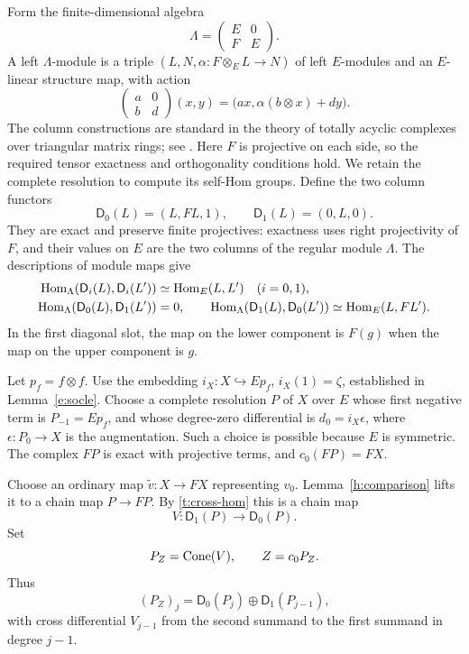 Form the finite-dimensional algebra
\begin{equation}\label{t:triangular-algebra}
 \Lambda=\begin{pmatrix}E&0\\F&E\end{pmatrix}.
\end{equation}
A left $\Lambda$-module is a triple
$(L,N,\alpha:F\otimes_E L\to N)$ of left $E$-modules and an
$E$-linear structure map, with action
\[
 \begin{pmatrix}a&0\\b&d\end{pmatrix}(x,y)
 =\bigl(ax,\alpha(b\otimes x)+dy\bigr).
\]
The column constructions are standard in the theory of totally acyclic
complexes over triangular matrix rings; see
\cite[Lemma~2.2 and Proposition~2.3]{EshraghiEtAl2014v1}.
Here $F$ is projective on each side, so the required tensor exactness
and orthogonality conditions hold. We retain the complete resolution
to compute its self-Hom groups. Define the two column functors
\[
 \mathsf D_0(L)=(L,FL,1),
 \qquad \mathsf D_1(L)=(0,L,0).
\]
They are exact and preserve finite projectives: exactness uses right
projectivity of $F$, and their values on $E$ are the two columns of
the regular module $\Lambda$.  The descriptions of module maps give
\begin{align}
 \operatorname{Hom}_\Lambda(\mathsf D_i(L),\mathsf D_i(L'))
   &\simeq\operatorname{Hom}_E(L,L')\quad(i=0,1),\label{t:diagonal-hom}\\
 \operatorname{Hom}_\Lambda(\mathsf D_0(L),\mathsf D_1(L'))&=0,
 \qquad
 \operatorname{Hom}_\Lambda(\mathsf D_1(L),\mathsf D_0(L'))
   \simeq\operatorname{Hom}_E(L,FL').\label{t:cross-hom}
\end{align}
In the first diagonal slot, the map on the lower component is $F(g)$
when the map on the upper component is $g$.

Let $p_f=f\otimes f$.  Use the embedding
$i_X:X\hookrightarrow Ep_f$, $i_X(1)=\zeta$, established in
Lemma~\ref{e:socle}.  Choose a complete resolution
$P$ of $X$ over $E$ whose first negative term is
$P_{-1}=Ep_f$, and whose degree-zero differential is
$d_0=i_X\epsilon$, where $\epsilon:P_0\to X$ is the augmentation.
Such a choice is possible because $E$ is symmetric.  The complex
$FP$ is exact with projective terms, and $c_0(FP)=FX$.

Choose an ordinary map $\widetilde v:X\to FX$ representing $v_0$.
Lemma~\ref{h:comparison} lifts it to a chain map $P\to FP$.
By \eqref{t:cross-hom} this is a chain map
\[
 V:\mathsf D_1(P)\longrightarrow\mathsf D_0(P).
\]
Set
\begin{equation}\label{t:cone}
 P_Z=\operatorname{Cone}(V),\qquad Z=c_0P_Z.
\end{equation}
Thus
\[
 (P_Z)_j=\mathsf D_0(P_j)\oplus\mathsf D_1(P_{j-1}),
\]
with cross differential $V_{j-1}$ from the second summand to the
first summand in degree $j-1$.

